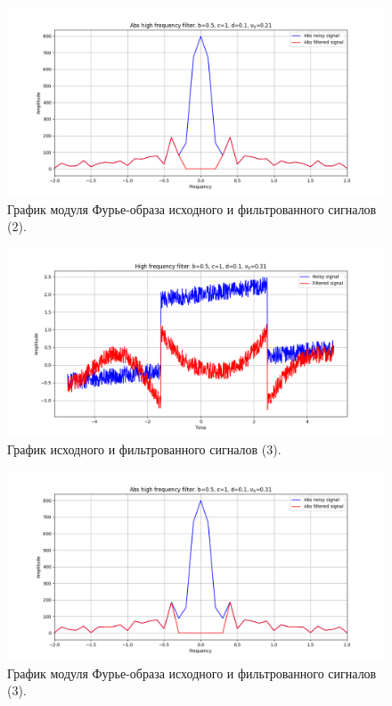 \documentclass[a4paper, 12pt]{article}
\begin{document}
    \begin{figure}[H]
        \centering
        \includegraphics[scale=0.48]{2_abs_u_U_nolow.png}
        \captionsetup{skip=0pt}
        \caption{График модуля Фурье-образа исходного и фильтрованного сигналов (2).}
        \label{fig:fig30}
    \end{figure}
    \begin{figure}[!htb]
        \centering
        \includegraphics[scale=0.48]{3_u_flt_u_nolow.png}
        \captionsetup{skip=0pt}
        \caption{График исходного и фильтрованного сигналов (3).}
        \label{fig:fig31}
    \end{figure}
    \newpage
    \begin{figure}[!htb]
        \centering
        \includegraphics[scale=0.48]{3_abs_u_U_nolow.png}
        \captionsetup{skip=0pt}
        \caption{График модуля Фурье-образа исходного и фильтрованного сигналов (3).}
        \label{fig:fig32}
    \end{figure}
\end{document}
